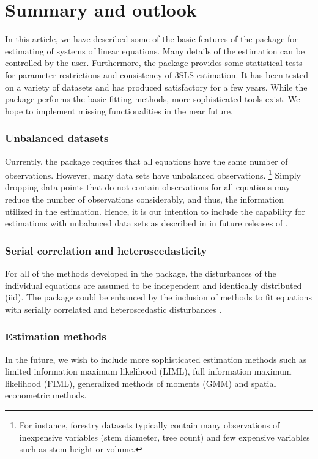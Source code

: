

\section{Summary and outlook}\label{sec:Summmary}
\nopagebreak
In this article, we have described some of the basic features of the
 package for estimating of systems of linear
equations.
Many details of the estimation can be controlled by the user.
Furthermore, the package provides some statistical tests
for parameter restrictions and consistency of 3SLS estimation.
It has been tested on a variety of datasets and has produced satisfactory
for a few years.
While the  package performs the basic fitting methods,
more sophisticated tools exist.
We hope to implement missing functionalities
in the near future.

\subsubsection*{Unbalanced datasets}
Currently, the  package requires
that all equations have the same number of observations.
However, many data sets have unbalanced observations.%
\footnote{
For instance,
forestry datasets typically contain many observations of inexpensive
variables (stem diameter, tree count) and few expensive variables such
as stem height or volume.
}
Simply dropping data points that do not contain observations for all
equations may reduce the number of observations considerably, and
thus, the information utilized in the estimation.
Hence, it is our intention to include the capability for estimations
with unbalanced data sets as described in \citet{schmidt77} in future
releases of .

\subsubsection*{Serial correlation and heteroscedasticity}
For all of the methods developed in the package, the disturbances of
the individual equations are assumed to be independent and identically
distributed (iid).
The package could be enhanced by the inclusion of methods to fit
equations with serially correlated and heteroscedastic disturbances
\citep{parks67}. 

\subsubsection*{Estimation methods}
In the future, we wish to include more sophisticated estimation
methods such as limited information maximum likelihood (LIML),
full information maximum likelihood (FIML), generalized methods of
moments (GMM) and spatial econometric methods. 

